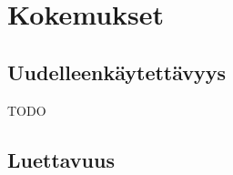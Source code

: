 \vspace{21.5pt}
\chapter{Kokemukset}




\section{Uudelleenkäytettävyys}
TODO


\section{Luettavuus}





